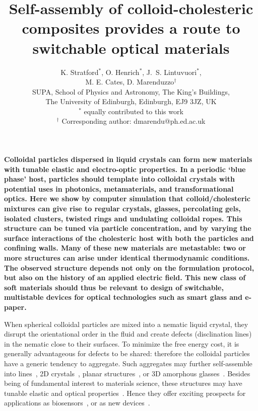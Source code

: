 \documentclass[12pt]{article}
\begin{document}
\title{Self-assembly of colloid-cholesteric composites provides
a route to switchable optical materials}

\author{K. Stratford$^{*}$, O. Henrich$^{*}$, J.~S. Lintuvuori$^{*}$,\\
M. E. Cates, D. Marenduzzo$^\dagger$ \\ 
SUPA, School of Physics and Astronomy, The King's Buildings,\\
The University of Edinburgh, Edinburgh, EJ9 3JZ, UK\\
\small{$^{*}$ equally contributed to this work}\\
\small{$^\dagger$ Corresponding author: dmarendu@ph.ed.ac.uk}
}
\date{}

\maketitle

\noindent

\noindent
{\bf
Colloidal particles dispersed in liquid crystals can form new materials
with tunable elastic and electro-optic properties. In a periodic `blue
phase' host, particles should template into colloidal crystals with
potential uses in photonics, metamaterials, and transformational optics.
Here we show by computer simulation that colloid/cholesteric mixtures can
give rise to regular crystals, glasses, percolating gels, isolated clusters,
twisted rings and undulating colloidal ropes. This structure can be tuned
via particle concentration, and by varying the surface interactions of the
cholesteric host with both
the particles and confining walls. Many of these new materials are metastable:
two or more structures can arise under identical thermodynamic conditions.
The observed structure depends not only on the formulation protocol, but also
on the history of an applied electric field. This new class of soft materials
should thus be relevant to design of switchable, multistable devices for
optical technologies such as smart glass and e-paper.
}


\bigskip
\noindent

\noindent
When spherical colloidal particles are mixed into a nematic liquid crystal, 
they disrupt the orientational order in the fluid and create defects (disclination lines) in the nematic close to their surfaces. To minimize the free energy cost, it is generally advantageous for defects to be shared:
therefore the colloidal particles have a generic tendency to aggregate. Such aggregates may further 
self-assemble into lines~\cite{wiresmiha}, 2D crystals~\cite{zumer}, 
planar structures~\cite{tanaka}, or 3D amorphous glasses~\cite{tiffany}.
Besides being of fundamental interest to materials science, these
structures may have tunable elastic and optical properties~\cite{stark}. Hence 
they offer exciting prospects for applications as biosensors~\cite{abbott}, or
as new devices~\cite{colloiddevice,tanakanatmat}.
\end{document}
